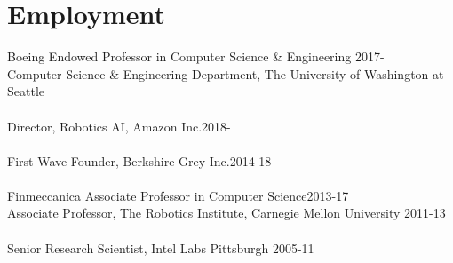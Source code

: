 
\section{Employment}
\noindent
Boeing Endowed Professor in Computer Science \& Engineering \hfill 2017-\phantom{20}\\
Computer Science \& Engineering Department, 
The University of Washington at Seattle\\
\\
Director, Robotics AI, Amazon Inc.\hfill 2018-\phantom{20}\\
\\
First Wave Founder, Berkshire Grey Inc.\hfill 2014-18\\
\\
Finmeccanica Associate Professor in Computer Science\hfill 2013-17\\
Associate Professor, 
The Robotics Institute,  Carnegie Mellon University
\hfill 2011-13\\
\\
Senior Research Scientist, Intel Labs Pittsburgh \hfill 2005-11

